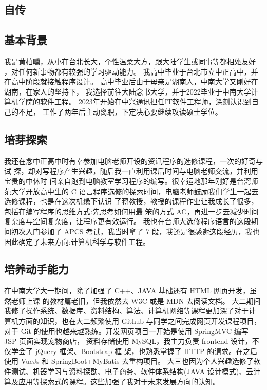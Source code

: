 \documentclass{article}
\begin{document}
\pagestyle{empty}  %
\begin{bibunit}[plain]
\section{自传}
\subsection{基本背景}

我是黄柏曛，从小在台北长大，个性温柔大方，跟大陆学生或同事等都相处友好
，对任何新事物都有较强的学习驱动能力。
我高中毕业于台北市立中正高中，并在高中阶段就接触程序设计。
高中毕业后由于母亲是湖南人，中南大学又刚好在湖南，在家人的坚持下，
我选择前往大陆念书大学，并于2022毕业于中南大学计算机学院的软件工程。
2023年开始在中兴通讯担任IT软件工程师，深刻认识到自己的不足，
工作了两年后主动离职，下定决心要继续攻读硕士学位。

\subsection{培芽探索}
我还在念中正高中时有幸参加电脑老师开设的资讯程序的选修课程，一次的好奇与试
探，却对写程序产生兴趣，随后我一直利用课后时间与电脑老师交流，并利用宝贵的中休时
间亲自跑到电脑教室学习程序的编写。很幸运地那年刚好是台湾师范大学开放高中生的 C
语言程序选修的探索时间，电脑老师鼓励我们学生一起去选修课程，也是在这次机缘下认识
了蒋教授，教授的课程作业让我成长了很多，包括在编写程序的思维方式:先思考如何用最
笨的方式 AC，再进一步去减少时间复杂度与空间复杂度，让程序更有效运行。
我也在台师大选修程序语言的这段期间初次入门参加了 APCS 考试，我当时拿了 7
段，我还是很感谢这段经历，我也因此确定了未来方向:计算机科学与软件工程。

\subsection{培养动手能力}
在中南大学大一期间，除了加强了 C++、JAVA 基础还有 HTML 网页开发，虽然老师上课
的教材篇老旧，但我依然去 W3C 或是 MDN 去阅读文档。
大二期间我修了操作系统、数据库、资料结构、算法、计算机网络等课程更加深了对于计
算机方面的知识，也在大二频繁使用 Github 与同学之间完成网页开发课程项目，对于 Git
的使用也越来越熟练。开发网页项目一开始是使用 SpringMVC 编写 JSP 页面实现宠物商店，
资料存储使用 MySQL，我主力负责 frontend 设计，不仅学会了 jQuery 框架、Bootstrap 框
架，也熟悉掌握了 HTTP 的请求。在之后使用 VueJs 和 SpringBoot+MyBatis 去重构项目。
大三也因为个人兴趣选修了软件测试、机器学习与资料探勘、电子商务、软件体系结构(JAVA
设计模式)、云计算及应用等探索式的课程。这些加强了我对于未来发展方向的认知。


\end{bibunit}
\end{document}
